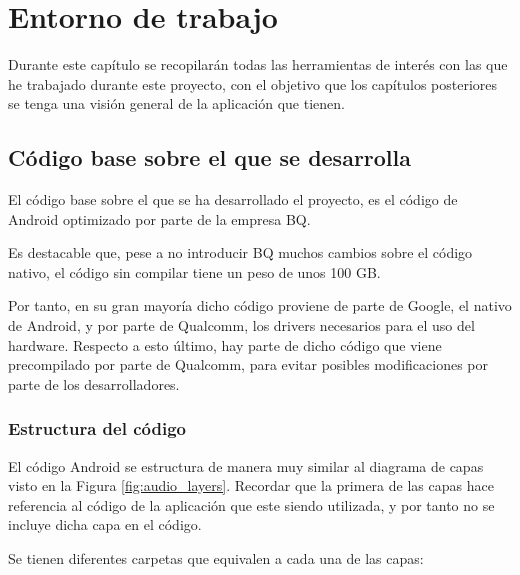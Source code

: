 \chapter{Entorno de trabajo}
Durante este capítulo se recopilarán todas las herramientas de interés con las que he trabajado durante este proyecto, con el objetivo que los capítulos posteriores se tenga una visión general de la aplicación que tienen.

\section{Código base sobre el que se desarrolla}
El código base sobre el que se ha desarrollado el proyecto, es el código de Android optimizado por parte de la empresa BQ.

Es destacable que, pese a no introducir BQ muchos cambios sobre el código nativo, el código sin compilar tiene un peso de unos 100 \gls{GB}.

Por tanto, en su gran mayoría dicho código proviene de parte de Google, el nativo de Android, y por parte de Qualcomm, los drivers necesarios para el uso del hardware. Respecto a esto último, hay parte de dicho código que viene precompilado por parte de Qualcomm, para evitar posibles modificaciones por parte de los desarrolladores.


\subsection{Estructura del código}
El código Android se estructura de manera muy similar al diagrama de capas visto en la Figura \ref{fig:audio_layers}. Recordar que la primera de las capas hace referencia al código de la aplicación que este siendo utilizada, y por tanto no se incluye dicha capa en el código.

Se tienen diferentes carpetas que equivalen a cada una de las capas:

